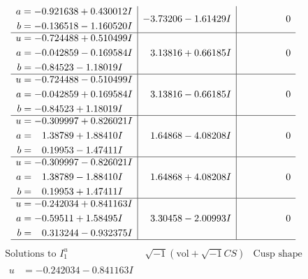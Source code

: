 \documentclass[1p]{elsarticle_modified}
\theoremstyle{definition}
\newcommand{\I}{\sqrt{-1}}
\begin{document}
$$\begin{array}{c|c|c}
\begin{aligned}
a &= -0.921638 + 0.430012 I \\
b &= -0.136518 - 1.160520 I\end{aligned}
 & -3.73206 - 1.61429 I & \phantom{-0.000000 } 0 \\ \hline\begin{aligned}
u &= -0.724488 + 0.510499 I \\
a &= -0.042859 - 0.169584 I \\
b &= -0.84523 - 1.18019 I\end{aligned}
 & \phantom{-}3.13816 + 0.66185 I & \phantom{-0.000000 } 0 \\ \hline\begin{aligned}
u &= -0.724488 - 0.510499 I \\
a &= -0.042859 + 0.169584 I \\
b &= -0.84523 + 1.18019 I\end{aligned}
 & \phantom{-}3.13816 - 0.66185 I & \phantom{-0.000000 } 0 \\ \hline\begin{aligned}
u &= -0.309997 + 0.826021 I \\
a &= \phantom{-}1.38789 + 1.88410 I \\
b &= \phantom{-}0.19953 - 1.47411 I\end{aligned}
 & \phantom{-}1.64868 - 4.08208 I & \phantom{-0.000000 } 0 \\ \hline\begin{aligned}
u &= -0.309997 - 0.826021 I \\
a &= \phantom{-}1.38789 - 1.88410 I \\
b &= \phantom{-}0.19953 + 1.47411 I\end{aligned}
 & \phantom{-}1.64868 + 4.08208 I & \phantom{-0.000000 } 0 \\ \hline\begin{aligned}
u &= -0.242034 + 0.841163 I \\
a &= -0.59511 + 1.58495 I \\
b &= \phantom{-}0.313244 - 0.932375 I\end{aligned}
 & \phantom{-}3.30458 - 2.00993 I & \phantom{-0.000000 } 0\\
 \hline 
 \end{array}$$\newpage$$\begin{array}{c|c|c}  
\text{Solutions to }I^u_{1}& \I (\text{vol} + \sqrt{-1}CS) & \text{Cusp shape}\\
 \hline 
\begin{aligned}
u &= -0.242034 - 0.841163 I \\

\end{aligned}
\end{array}$$
\end{document}
